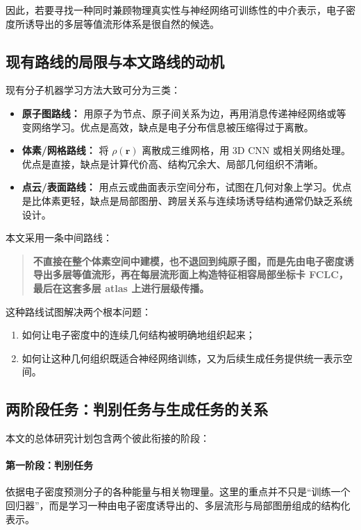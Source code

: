 \documentclass[12pt,a4paper]{ctexart}
\begin{document}
因此，若要寻找一种同时兼顾物理真实性与神经网络可训练性的中介表示，电子密度所诱导出的多层等值流形体系是很自然的候选。

\subsection{现有路线的局限与本文路线的动机}

现有分子机器学习方法大致可分为三类：

\begin{itemize}[leftmargin=2em]
    \item \textbf{原子图路线：} 用原子为节点、原子间关系为边，再用消息传递神经网络或等变网络学习。优点是高效，缺点是电子分布信息被压缩得过于离散。
    \item \textbf{体素/网格路线：} 将 \(\rho(\mathbf r)\) 离散成三维网格，用 3D CNN 或相关网络处理。优点是直接，缺点是计算代价高、结构冗余大、局部几何组织不清晰。
    \item \textbf{点云/表面路线：} 用点云或曲面表示空间分布，试图在几何对象上学习。优点是比体素更轻，缺点是局部图册、跨层关系与连续场诱导结构通常仍缺乏系统设计。
\end{itemize}

本文采用一条中间路线：

\begin{quote}
\textbf{不直接在整个体素空间中建模，也不退回到纯原子图，而是先由电子密度诱导出多层等值流形，再在每层流形面上构造特征相容局部坐标卡 FCLC，最后在这套多层 atlas 上进行层级传播。}
\end{quote}

这种路线试图解决两个根本问题：

\begin{enumerate}[leftmargin=2em]
    \item 如何让电子密度中的连续几何结构被明确地组织起来；
    \item 如何让这种几何组织既适合神经网络训练，又为后续生成任务提供统一表示空间。
\end{enumerate}

\subsection{两阶段任务：判别任务与生成任务的关系}

本文的总体研究计划包含两个彼此衔接的阶段：

\paragraph{第一阶段：判别任务}
依据电子密度预测分子的各种能量与相关物理量。这里的重点并不只是“训练一个回归器”，而是学习一种由电子密度诱导出的、多层流形与局部图册组成的结构化表示。
\end{document}
